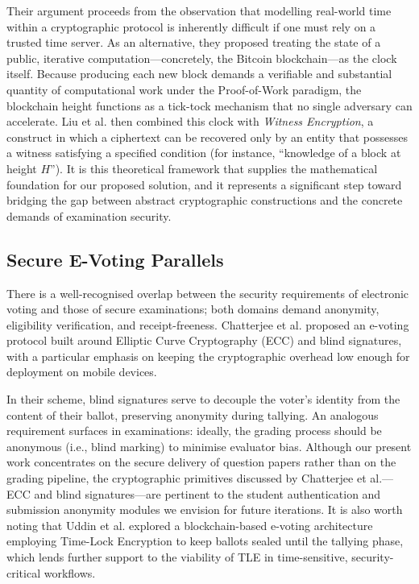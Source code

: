 \documentclass[final,5p,times]{elsarticle}
\begin{document}
Their argument proceeds from the observation that modelling real-world time within a cryptographic protocol is inherently difficult if one must rely on a trusted time server. As an alternative, they proposed treating the state of a public, iterative computation—concretely, the Bitcoin blockchain—as the clock itself. Because producing each new block demands a verifiable and substantial quantity of computational work under the Proof-of-Work paradigm, the blockchain height functions as a tick-tock mechanism that no single adversary can accelerate. Liu et al. then combined this clock with \textit{Witness Encryption}, a construct in which a ciphertext can be recovered only by an entity that possesses a witness satisfying a specified condition (for instance, ``knowledge of a block at height $H$''). It is this theoretical framework that supplies the mathematical foundation for our proposed solution, and it represents a significant step toward bridging the gap between abstract cryptographic constructions and the concrete demands of examination security.

\subsection{Secure E-Voting Parallels}
There is a well-recognised overlap between the security requirements of electronic voting and those of secure examinations; both domains demand anonymity, eligibility verification, and receipt-freeness. Chatterjee et al. \cite{chatterjee2023efficient} proposed an e-voting protocol built around Elliptic Curve Cryptography (ECC) and blind signatures, with a particular emphasis on keeping the cryptographic overhead low enough for deployment on mobile devices.

In their scheme, blind signatures serve to decouple the voter's identity from the content of their ballot, preserving anonymity during tallying. An analogous requirement surfaces in examinations: ideally, the grading process should be anonymous (i.e., blind marking) to minimise evaluator bias. Although our present work concentrates on the secure delivery of question papers rather than on the grading pipeline, the cryptographic primitives discussed by Chatterjee et al.—ECC and blind signatures—are pertinent to the student authentication and submission anonymity modules we envision for future iterations. It is also worth noting that Uddin et al. \cite{9498566} explored a blockchain-based e-voting architecture employing Time-Lock Encryption to keep ballots sealed until the tallying phase, which lends further support to the viability of TLE in time-sensitive, security-critical workflows.
\end{document}
